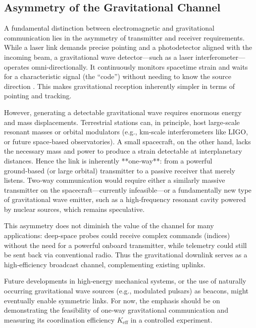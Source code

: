 \documentclass[12pt,a4paper]{article}
\begin{document}
	\subsection{Asymmetry of the Gravitational Channel}
	\label{subsec:asymmetry}
	
	A fundamental distinction between electromagnetic and gravitational communication lies in the asymmetry of transmitter and receiver requirements. While a laser link demands precise pointing and a photodetector aligned with the incoming beam, a gravitational wave detector—such as a laser interferometer—operates omni‑directionally. It continuously monitors spacetime strain and waits for a characteristic signal (the “code”) without needing to know the source direction \cite{LIGO}. This makes gravitational reception inherently simpler in terms of pointing and tracking.
	
	However, generating a detectable gravitational wave requires enormous energy and mass displacements. Terrestrial stations can, in principle, host large-scale resonant masses or orbital modulators (e.g., km‑scale interferometers like LIGO, or future space‑based observatories). A small spacecraft, on the other hand, lacks the necessary mass and power to produce a strain detectable at interplanetary distances. Hence the link is inherently **one‑way**: from a powerful ground‑based (or large orbital) transmitter to a passive receiver that merely listens. Two‑way communication would require either a similarly massive transmitter on the spacecraft—currently infeasible—or a fundamentally new type of gravitational wave emitter, such as a high‑frequency resonant cavity powered by nuclear sources, which remains speculative.
	
	This asymmetry does not diminish the value of the channel for many applications: deep‑space probes could receive complex commands (indices) without the need for a powerful onboard transmitter, while telemetry could still be sent back via conventional radio. Thus the gravitational downlink serves as a high‑efficiency broadcast channel, complementing existing uplinks.
	
	Future developments in high‑energy mechanical systems, or the use of naturally occurring gravitational wave sources (e.g., modulated pulsars) as beacons, might eventually enable symmetric links. For now, the emphasis should be on demonstrating the feasibility of one‑way gravitational communication and measuring its coordination efficiency \(K_{\mathrm{eff}}\) in a controlled experiment.
	
\end{document}
